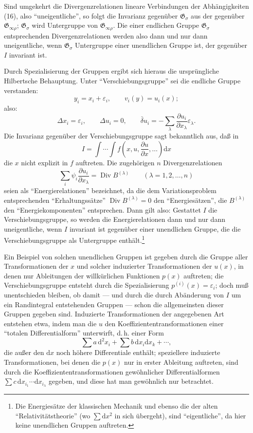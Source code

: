 \documentclass[11pt]{article}
\newcommand{\D}{\Delta}
\providecommand{\eps}{\varepsilon}
\providecommand{\dd}{\mathrm d}
\providecommand{\Div}{\operatorname{Div}}
\providecommand{\G}{\mathfrak G}
\providecommand{\bd}{\bar{\delta}}
\providecommand{\p}{\partial}
\providecommand{\p}{\partial}
\providecommand{\dd}{\mathrm d}
\begin{document}
Sind umgekehrt die Divergenzrelationen lineare Verbindungen der Abhängigkeiten (16), also ``uneigentliche'', so folgt die Invarianz gegenüber \(\G_\sigma\) aus der gegenüber \(\G_{\infty\rho}\); \(\G_\sigma\) wird Untergruppe von \(\G_{\infty\rho}\). Die einer endlichen Gruppe \(\G_\sigma\) entsprechenden Divergenzrelationen werden also dann und nur dann uneigentliche, wenn \(\G_\sigma\) Untergruppe einer unendlichen Gruppe ist, der gegenüber \(I\) invariant ist.

Durch Spezialisierung der Gruppen ergibt sich hieraus die ursprüngliche Hilbertsche Behauptung. Unter ``Verschiebungsgruppe'' sei die endliche Gruppe verstanden:
\[
y_i=x_i+\eps_i,\qquad v_i(y)=u_i(x);
\]
also:
\[
\D x_i=\eps_i,\qquad \D u_i=0,\qquad
\bd u_i=-\sum_\lambda\frac{\p u_i}{\p x_\lambda}\eps_\lambda.
\]
Die Invarianz gegenüber der Verschiebungsgruppe sagt bekanntlich aus, daß in
\[
I=\int\!\cdots\!\int f\!\left(x,u,\frac{\p u}{\p x},\ldots\right)\dd x
\]
die \(x\) nicht explizit in \(f\) auftreten. Die zugehörigen \(n\) Divergenzrelationen
\[
\sum_i\psi_i\frac{\p u_i}{\p x_\lambda}=\Div B^{(\lambda)}
\qquad(\lambda=1,2,\ldots,n)
\]
seien als ``Energierelationen'' bezeichnet, da die dem Variationsproblem entsprechenden ``Erhaltungssätze'' \(\Div B^{(\lambda)}=0\) den ``Energiesätzen'', die \(B^{(\lambda)}\) den ``Energiekomponenten'' entsprechen. Dann gilt also: Gestattet \(I\) die Verschiebungsgruppe, so werden die Energierelationen dann und nur dann uneigentliche, wenn \(I\) invariant ist gegenüber einer unendlichen Gruppe, die die Verschiebungsgruppe als Untergruppe enthält.\footnote{Die Energiesätze der klassischen Mechanik und ebenso die der alten ``Relativitätstheorie'' (wo \(\sum \dd x^2\) in sich übergeht), sind ``eigentliche'', da hier keine unendlichen Gruppen auftreten.}

Ein Beispiel von solchen unendlichen Gruppen ist gegeben durch die Gruppe aller Transformationen der \(x\) und solcher induzierter Transformationen der \(u(x)\), in denen nur Ableitungen der willkürlichen Funktionen \(p(x)\) auftreten; die Verschiebungsgruppe entsteht durch die Spezialisierung \(p^{(i)}(x)=\eps_i\); doch muß unentschieden bleiben, ob damit --- und durch die durch Abänderung von \(I\) um ein Randintegral entstehenden Gruppen --- schon die allgemeinsten dieser Gruppen gegeben sind. Induzierte Transformationen der angegebenen Art entstehen etwa, indem man die \(u\) den Koeffiziententransformationen einer ``totalen Differentialform'' unterwirft, d.\,h. einer Form
\[
\sum a\,\dd^2x_i+\sum b\,\dd x_i\dd x_k+\cdots,
\]
die außer den \(\dd x\) noch höhere Differentiale enthält; speziellere induzierte Transformationen, bei denen die \(p(x)\) nur in erster Ableitung auftreten, sind durch die Koeffiziententransformationen gewöhnlicher Differentialformen \(\sum c\,\dd x_{i_1}\cdots \dd x_{i_\lambda}\) gegeben, und diese hat man gewöhnlich nur betrachtet.
\end{document}
